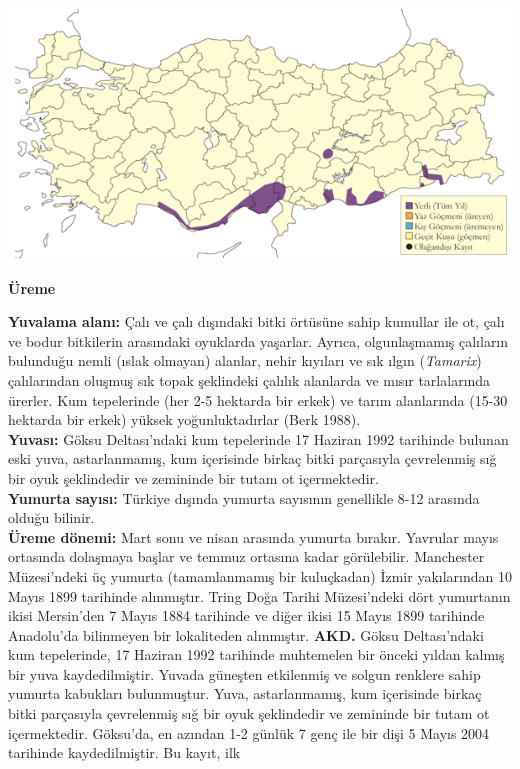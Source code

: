 \documentclass[
  letterpaper,
  DIV=11,
  numbers=noendperiod]{scrreprt}
\begin{document}
\includegraphics{images/harita_Page_041.png}

\textbf{Üreme}

\textbf{Yuvalama alanı:} Çalı ve çalı dışındaki bitki örtüsüne sahip
kumullar ile ot, çalı ve bodur bitkilerin arasındaki oyuklarda yaşarlar.
Ayrıca, olgunlaşmamış çalıların bulunduğu nemli (ıslak olmayan) alanlar,
nehir kıyıları ve sık ılgın (\emph{Tamarix}) çalılarından oluşmuş sık
topak şeklindeki çalılık alanlarda ve mısır tarlalarında ürerler. Kum
tepelerinde (her 2-5 hektarda bir erkek) ve tarım alanlarında (15-30
hektarda bir erkek) yüksek yoğunluktadırlar (Berk 1988).\\
\textbf{Yuvası:} Göksu Deltası'ndaki kum tepelerinde 17 Haziran 1992
tarihinde bulunan eski yuva, astarlanmamış, kum içerisinde birkaç bitki
parçasıyla çevrelenmiş sığ bir oyuk şeklindedir ve zemininde bir tutam
ot içermektedir.\\
\textbf{Yumurta sayısı:} Türkiye dışında yumurta sayısının genellikle
8-12 arasında olduğu bilinir.\\
\textbf{Üreme dönemi:} Mart sonu ve nisan arasında yumurta bırakır.
Yavrular mayıs ortasında dolaşmaya başlar ve temmuz ortasına kadar
görülebilir. Manchester Müzesi'ndeki üç yumurta (tamamlanmamış bir
kuluçkadan) İzmir yakılarından 10 Mayıs 1899 tarihinde alınmıştır. Tring
Doğa Tarihi Müzesi'ndeki dört yumurtanın ikisi Mersin'den 7 Mayıs 1884
tarihinde ve diğer ikisi 15 Mayıs 1899 tarihinde Anadolu'da bilinmeyen
bir lokaliteden alınmıştır. \textbf{AKD.} Göksu Deltası'ndaki kum
tepelerinde, 17 Haziran 1992 tarihinde muhtemelen bir önceki yıldan
kalmış bir yuva kaydedilmiştir. Yuvada güneşten etkilenmiş ve solgun
renklere sahip yumurta kabukları bulunmuştur. Yuva, astarlanmamış, kum
içerisinde birkaç bitki parçasıyla çevrelenmiş sığ bir oyuk şeklindedir
ve zemininde bir tutam ot içermektedir. Göksu'da, en azından 1-2 günlük
7 genç ile bir dişi 5 Mayıs 2004 tarihinde kaydedilmiştir. Bu kayıt, ilk
\end{document}

